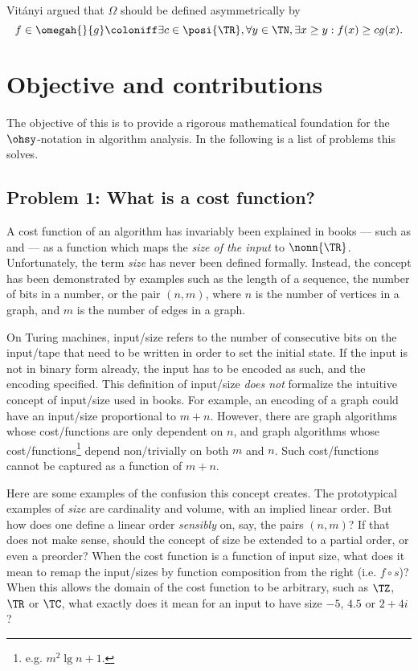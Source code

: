 \documentclass[b5paper, english, oneside]{memoir}
\begin{document}
Vit\'anyi \cite{BigOmegaVsWild} argued that $\Omega$ should be defined asymmetrically by
\begin{equation}
f \in \omegah{}{g} \coloniff \exists c \in \posi{\TR}, \forall y \in \TN, \exists x \geq y: f(x) \geq cg(x).
\end{equation}

\section{Objective and contributions}

The objective of this \manuscript{} is to provide a rigorous mathematical foundation for the $\ohsy$-notation in algorithm analysis. In the following is a list of problems this \manuscript{} solves. 

\subsection{Problem 1: What is a cost function?}

A cost function of an algorithm has invariably been explained in books --- such as \cite{DesignAndAnalysisOfComputerAlgorithms} and \cite{IntroAlgo2009} --- as a function which maps the \emph{size of the input} to $\nonn{\TR}$. Unfortunately, the term \emph{size} has never been defined formally. Instead, the concept has been demonstrated by examples such as the length of a sequence, the number of bits in a number, or the pair $(n, m)$, where $n$ is the number of vertices in a graph, and $m$ is the number of edges in a graph. 

On Turing machines, input\-/size refers to the number of consecutive bits on the input\-/tape that need to be written in order to set the initial state. If the input is not in binary form already, the input has to be encoded as such, and the encoding specified. This definition of input\-/size \emph{does not} formalize the intuitive concept of input\-/size used in books. For example, an encoding of a graph could have an input\-/size proportional to $m + n$. However, there are graph algorithms whose cost\-/functions are only dependent on $n$, and graph algorithms whose cost\-/functions\footnote{e.g. $m^2 \lg{n + 1}$.} depend non\-/trivially on both $m$ and $n$. Such cost\-/functions cannot be captured as a function of $m + n$.

Here are some examples of the confusion this concept creates. The prototypical examples of \emph{size} are cardinality and volume, with an implied linear order. But how does one define a linear order \emph{sensibly} on, say, the pairs $(n, m)$? If that does not make sense, should the concept of size be extended to a partial order, or even a preorder? When the cost function is a function of input size, what does it mean to remap the input\-/sizes by function composition from the right (i.e. $f \circ s$)? When this \manuscript{} allows the domain of the cost function to be arbitrary, such as $\TZ$, $\TR$ or $\TC$, what exactly does it mean for an input to have size $-5$, $4.5$ or $2 + 4i$?
\end{document}

